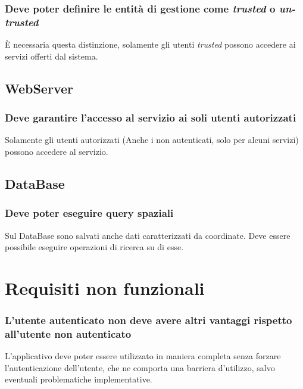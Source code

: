 \documentclass{article}
\begin{document}
\subsubsection{Deve poter definire le entità di gestione come \textit{trusted} o \textit{un-trusted}}
\label{5.5.4}
È necessaria questa distinzione, solamente gli utenti \textit{trusted} possono accedere ai servizi offerti dal sistema.

\subsection{WebServer}

\subsubsection{Deve garantire l'accesso al servizio ai soli utenti autorizzati}
\label{5.6.1}
Solamente gli utenti autorizzati (Anche i non autenticati, solo per alcuni servizi) possono accedere al servizio.

\subsection{DataBase}

\subsubsection{Deve poter eseguire query spaziali}
\label{5.7.1}
Sul DataBase sono salvati anche dati caratterizzati da coordinate. Deve essere possibile eseguire operazioni di ricerca su di esse.

\clearpage

\section{Requisiti non funzionali}

\subsubsection{L'utente autenticato non deve avere altri vantaggi rispetto all'utente non autenticato}
L'applicativo deve poter essere utilizzato in maniera completa senza forzare l'autenticazione dell'utente, che ne comporta una barriera d'utilizzo, salvo eventuali problematiche implementative.
\end{document}
